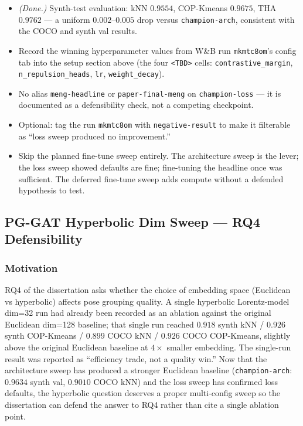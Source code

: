 \begin{itemize}
    \item \emph{(Done.)} Synth-test evaluation: kNN $0.9554$, COP-Kmeans $0.9675$, THA $0.9762$ --- a uniform $0.002$--$0.005$ drop versus \texttt{champion-arch}, consistent with the COCO and synth val results.
    \item Record the winning hyperparameter values from W\&B run \texttt{mkmtc8om}'s config tab into the setup section above (the four \texttt{<TBD>} cells: \texttt{contrastive\_margin}, \texttt{n\_repulsion\_heads}, \texttt{lr}, \texttt{weight\_decay}).
    \item No alias \texttt{meng-headline} or \texttt{paper-final-meng} on \texttt{champion-loss} --- it is documented as a defensibility check, not a competing checkpoint.
    \item Optional: tag the run \texttt{mkmtc8om} with \texttt{negative-result} to make it filterable as ``loss sweep produced no improvement.''
    \item Skip the planned fine-tune sweep entirely. The architecture sweep is the lever; the loss sweep showed defaults are fine; fine-tuning the headline once was sufficient. The deferred fine-tune sweep adds compute without a defended hypothesis to test.
\end{itemize}

\subsection{PG-GAT Hyperbolic Dim Sweep --- RQ4 Defensibility}

\subsubsection{Motivation}

RQ4 of the dissertation asks whether the choice of embedding space (Euclidean vs hyperbolic) affects pose grouping quality.
A single hyperbolic Lorentz-model dim=32 run had already been recorded as an ablation against the original Euclidean dim=128 baseline; that single run reached $0.918$ synth kNN / $0.926$ synth COP-Kmeans / $0.899$ COCO kNN / $0.926$ COCO COP-Kmeans, slightly above the original Euclidean baseline at $4\times$ smaller embedding.
The single-run result was reported as ``efficiency trade, not a quality win.''
Now that the architecture sweep has produced a stronger Euclidean baseline (\texttt{champion-arch}: $0.9634$ synth val, $0.9010$ COCO kNN) and the loss sweep has confirmed loss defaults, the hyperbolic question deserves a proper multi-config sweep so the dissertation can defend the answer to RQ4 rather than cite a single ablation point.

